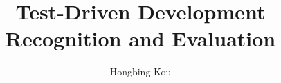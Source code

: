 \documentclass[11pt,proposal,times,thesis,actual]{uhthesis2e}
\begin{document}
\title{Test-Driven Development Recognition and Evaluation}
\author{Hongbing Kou}

\maketitle

\begin{frontmatter}

\end{frontmatter}






\end{document}
